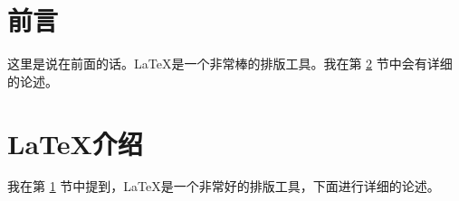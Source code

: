 \documentclass{ctexart}
\begin{document}
\section{前言}
\label{sec:introduction}
这里是说在前面的话。\LaTeX 是一个非常棒的排版工具。我在第 \ref{sec:detail} 节中会有详细的论述。
\section{\LaTeX 介绍}
\label{sec:detail}
我在第 \ref{sec:introduction} 节中提到，\LaTeX 是一个非常好的排版工具，下面进行详细的论述。
\end{document}
